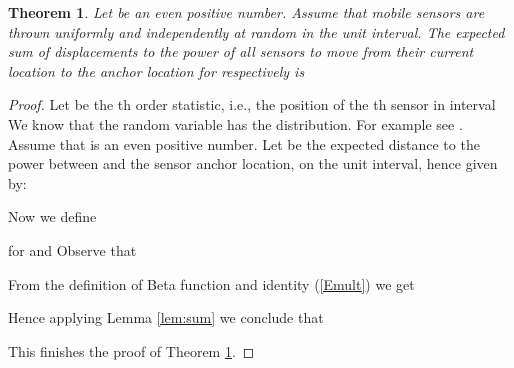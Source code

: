 \documentclass[final,5p,times,twocolumn]{elsarticle_mod}
\newtheorem{theorem}{Theorem}
\begin{document}
\begin{theorem} 
\label{thm:mainexactodd} 
Let  be an even positive number. Assume that  mobile sensors are thrown uniformly and independently at random in the unit interval. The expected sum
of displacements to the power  of all sensors to move from their current location to the anchor location 
for  respectively is  
\end{theorem}
\begin{proof}
Let  be the th order statistic, i.e., the position of the th sensor in interval 
We know that the random variable  has the  distribution. For example see \cite{nagaraja_1992}.
Assume that  is an even positive number.
Let  be the expected distance to the power  between  and the  sensor anchor location,  on the
unit interval, hence given by:

Now we define

for  and  Observe that

From the definition of Beta function and identity (\ref{Emult}) we get

Hence applying Lemma \ref{lem:sum} we conclude that

This finishes the proof of Theorem \ref{thm:mainexactodd}. 
\end{proof}
\end{document}
